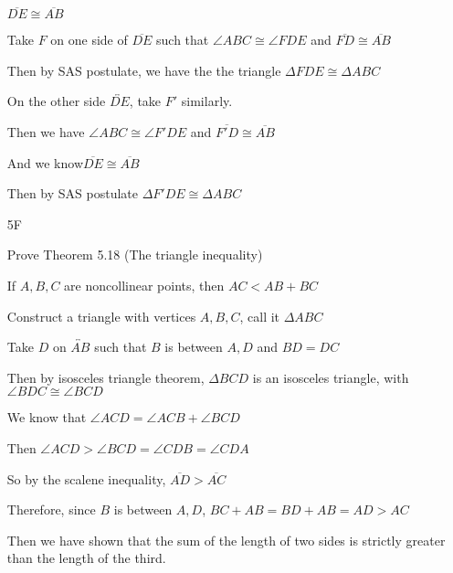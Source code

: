 \documentclass[11pt]{article}
\newcommand{\lines}[1]{\overleftrightarrow{#1}}
\newcommand{\segment}[1]{\overline{#1}}
\begin{document}
\begin{itemize}
		$\segment{DE} \cong \segment{AB}$

		Take $F$ on one side of $\segment{DE}$ such that $\angle{ABC} \cong \angle{FDE}$ and $\segment{FD} \cong \segment{AB}$

		Then by SAS postulate, we have the the triangle $\Delta FDE \cong \Delta ABC$

		On the other side $\lines{DE}$, take $F'$ similarly.

		Then we have $\angle{ABC} \cong \angle{F'DE}$ and $\segment{F'D}  \cong \segment{AB}$ 
	
		And we know$\segment{DE} \cong \segment{AB}$

		Then by SAS postulate $\Delta F'DE \cong \Delta ABC$

	\item[5F]

		Prove Theorem 5.18 (The triangle inequality)

		If $A,B,C$ are noncollinear points, then $AC < AB + BC$

		Construct a triangle with vertices $A,B,C$, call it $\Delta ABC$

		Take $D$ on $\lines{AB}$ such that $B$ is between $A,D$ and $BD = DC$

		Then by isosceles triangle theorem, $\Delta BCD$ is an isosceles triangle, with $\angle BDC \cong \angle BCD$

		We know that $\angle ACD = \angle ACB + \angle BCD$

		Then $\angle ACD > \angle BCD = \angle CDB = \angle CDA$

		So by the scalene inequality, $\segment{AD} > \segment{AC}$

		Therefore, since $B$ is between $A,D$, $BC + AB = BD + AB = AD > AC$

		Then we have shown that the sum of the length of two sides is strictly greater than the length of the third.
			
\end{itemize}
\end{document}
